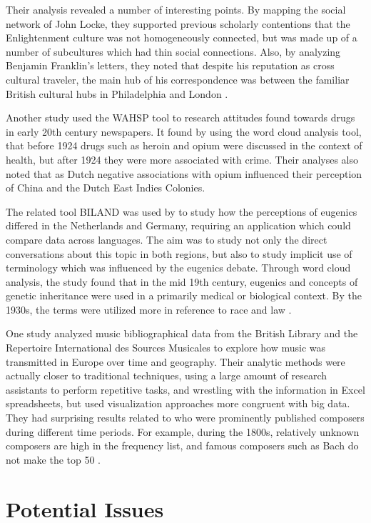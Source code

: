 \documentclass[sigconf]{acmart}
\begin{document}
Their analysis revealed a number of interesting points. By mapping the social network of John Locke, they supported previous scholarly contentions that the Enlightenment culture was not homogeneously connected, but was made up of a number of subcultures which had thin social connections. Also, by analyzing Benjamin Franklin's letters, they noted that despite his reputation as cross cultural traveler, the main hub of his correspondence was between the familiar British cultural hubs in Philadelphia and London \cite{digitalrepublicletters}.

Another study used the WAHSP tool to research attitudes found towards drugs in  early 20th century newspapers. It found by using the word cloud analysis tool, that before 1924  drugs such as heroin and opium were discussed in the context of health, but after 1924 they were more associated with crime. Their analyses also noted that as Dutch negative associations with opium influenced their perception of China and the Dutch East Indies Colonies.

The related tool BILAND was used by to study how the perceptions of eugenics differed in the Netherlands and Germany, requiring an application which could compare data across languages. The aim was to study not only the direct conversations about this topic in both regions, but also to study implicit use of terminology which was influenced by the eugenics debate. Through word cloud analysis, the study found that in the mid 19th century, eugenics and concepts of genetic inheritance were used in a primarily medical or biological context. By the 1930s, the terms were utilized more in reference to race and law \cite{bdglobalhist}.

One study analyzed music bibliographical data from the British Library and the Repertoire International des Sources Musicales to explore how music was transmitted in Europe over time and geography. Their analytic methods were actually closer to traditional techniques, using a large amount of research assistants to perform repetitive tasks, and wrestling with the information in Excel spreadsheets, but used visualization approaches more congruent with big data. They had surprising results related to who were prominently published composers during different time periods. For example, during the 1800s, relatively unknown composers are high in the frequency list, and famous composers such as Bach do not make the top 50 \cite{musichist}.

\section{Potential Issues}
\end{document}

